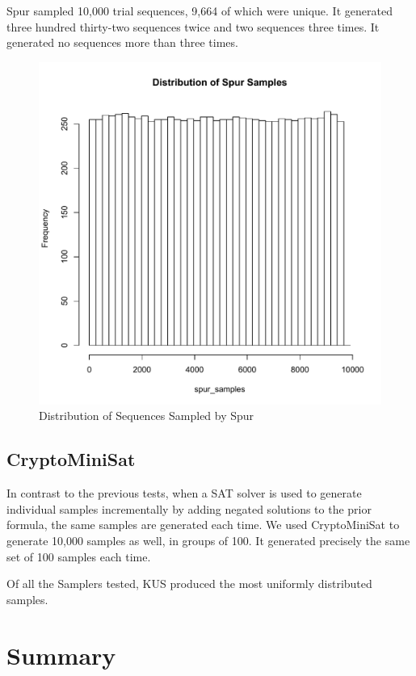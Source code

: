 Spur sampled 10,000 trial sequences, 9,664 of which were unique. It generated three hundred thirty-two sequences twice and two sequences three times. It generated no sequences more than three times.

\begin{figure}[htb]
\centering
\centerline{\includegraphics[origin=c,width=12cm]{../figures/spur-samples.pdf}}
\caption{Distribution of Sequences Sampled by Spur}
\label{fig:spur_samples}
\end{figure}

\subsection{CryptoMiniSat}

In contrast to the previous tests, when a SAT solver is used to generate individual samples incrementally by adding negated solutions to the prior formula, the same samples are generated each time. We used CryptoMiniSat to generate 10,000 samples as well, in groups of 100. It generated precisely the same set of 100 samples each time.


Of all the Samplers tested, KUS produced the most uniformly distributed samples.

\section{Summary}

